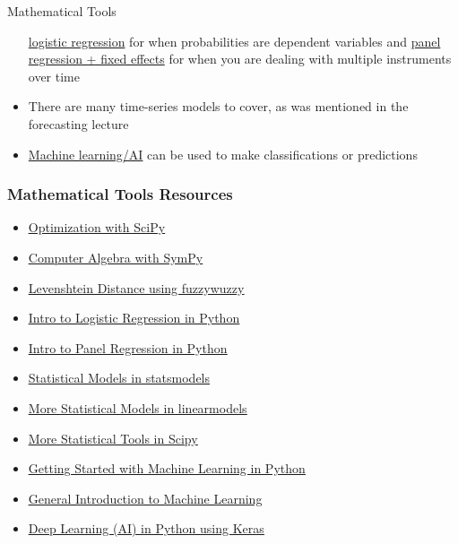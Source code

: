 \documentclass[handout, 11pt]{beamer}
\begin{document}
\begin{section}{Mathematical Tools}
\begin{frame}
\begin{itemize}
\underline{logistic regression}
for when
probabilities are dependent variables and
\underline{panel regression + fixed effects}
for when you are dealing
with multiple instruments over time
\vfill
\item There are many time-series models to cover, as was mentioned in the forecasting lecture
\vfill
\item \underline{Machine learning/AI}
can be used to make classifications or predictions
\end{itemize}
\end{frame}
\begin{frame}
\frametitle{Mathematical Tools Resources}
\begin{itemize}
\item \textcolor{blue}{\underline{\href{https://towardsdatascience.com/optimization-with-scipy-and-application-ideas-to-machine-learning-81d39c7938b8}{Optimization with SciPy}}}
\vfill
\item \textcolor{blue}{\underline{\href{https://docs.sympy.org/latest/tutorial/preliminaries.html}{Computer Algebra with SymPy}}}
\vfill
\item \textcolor{blue}{\underline{\href{https://www.geeksforgeeks.org/fuzzywuzzy-python-library/}{Levenshtein Distance using fuzzywuzzy}}}
\vfill
\item \textcolor{blue}{\underline{\href{https://towardsdatascience.com/logistic-regression-python-7c451928efee}{Intro to Logistic Regression in Python}}}
\vfill
\item \textcolor{blue}{\underline{\href{https://medium.com/pew-research-center-decoded/using-fixed-and-random-effects-models-for-panel-data-in-python-a795865736ab}{Intro to Panel Regression in Python}}}
\vfill
\item \textcolor{blue}{\underline{\href{https://www.statsmodels.org/stable/py-modindex.html}{Statistical Models in statsmodels}}}
\vfill
\item \textcolor{blue}{\underline{\href{https://bashtage.github.io/linearmodels/doc/index.html}{More Statistical Models in linearmodels}}}
\vfill
\item \textcolor{blue}{\underline{\href{https://docs.scipy.org/doc/scipy/reference/stats.html}{More Statistical Tools in Scipy}}}
\vfill
\item \textcolor{blue}{\underline{\href{https://machinelearningmastery.com/machine-learning-in-python-step-by-step/}{Getting Started with Machine Learning in Python}}}
\vfill
\item \textcolor{blue}{\underline{\href{https://machinelearningmastery.com/start-here/}{General Introduction to Machine Learning}}}
\vfill
\item \textcolor{blue}{\underline{\href{datacamp.com/community/tutorials/deep-learning-python}{Deep Learning (AI) in Python using Keras}}}
\end{itemize}
\end{frame}
\end{section}
\end{document}
